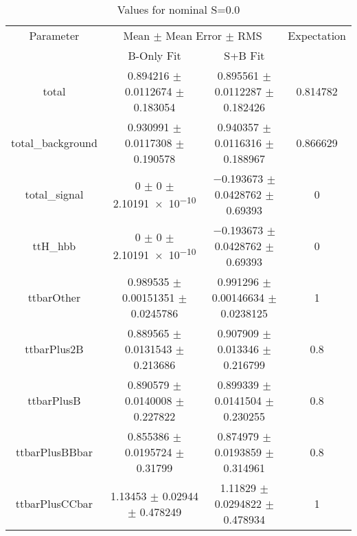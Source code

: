 \begin{table}
\centering
\caption{Values for nominal S=0.0}
\begin{tabular}{cccc}
\toprule
Parameter & \multicolumn{2}{c}{Mean $\pm$ Mean Error $\pm$ RMS} & Expectation\\
 & B-Only Fit & S+B Fit & \\
\midrule
total & \num{0.894216} $\pm$ \num{0.0112674} $\pm$ \num{0.183054} & \num{0.895561} $\pm$ \num{0.0112287} $\pm$ \num{0.182426} & \num{0.814782}\\
total\_background & \num{0.930991} $\pm$ \num{0.0117308} $\pm$ \num{0.190578} & \num{0.940357} $\pm$ \num{0.0116316} $\pm$ \num{0.188967} & \num{0.866629}\\
total\_signal & \num{0} $\pm$ \num{0} $\pm$ \num{2.10191e-10} & \num{-0.193673} $\pm$ \num{0.0428762} $\pm$ \num{0.69393} & \num{0}\\
ttH\_hbb & \num{0} $\pm$ \num{0} $\pm$ \num{2.10191e-10} & \num{-0.193673} $\pm$ \num{0.0428762} $\pm$ \num{0.69393} & \num{0}\\
ttbarOther & \num{0.989535} $\pm$ \num{0.00151351} $\pm$ \num{0.0245786} & \num{0.991296} $\pm$ \num{0.00146634} $\pm$ \num{0.0238125} & \num{1}\\
ttbarPlus2B & \num{0.889565} $\pm$ \num{0.0131543} $\pm$ \num{0.213686} & \num{0.907909} $\pm$ \num{0.013346} $\pm$ \num{0.216799} & \num{0.8}\\
ttbarPlusB & \num{0.890579} $\pm$ \num{0.0140008} $\pm$ \num{0.227822} & \num{0.899339} $\pm$ \num{0.0141504} $\pm$ \num{0.230255} & \num{0.8}\\
ttbarPlusBBbar & \num{0.855386} $\pm$ \num{0.0195724} $\pm$ \num{0.31799} & \num{0.874979} $\pm$ \num{0.0193859} $\pm$ \num{0.314961} & \num{0.8}\\
ttbarPlusCCbar & \num{1.13453} $\pm$ \num{0.02944} $\pm$ \num{0.478249} & \num{1.11829} $\pm$ \num{0.0294822} $\pm$ \num{0.478934} & \num{1}\\
\bottomrule
\end{tabular}
\end{table}